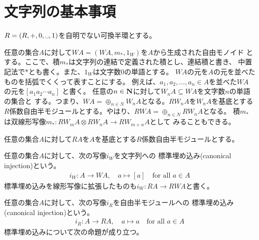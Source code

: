 \section{文字列の基本事項}\label{s1:文字列の基本事項} %
	$R=(R,+,0,\myspace,1)$を自明でない可換半環とする。

	任意の集合$A$に対して$WA=(WA,m_*,1_W)$を$A$から生成された自由モノイド
	とする。ここで、積$m_*$は文字列の連結で定義された積とし、連結積と書き、
	中置記法で$*$とも書く。また、$1_W$は文字数$0$の単語とする。
	$WA$の元を$A$の元を並べたものを括弧でくくって表すことにする。
	例えば、$a_1,a_2,\dots, a_n\in A$を並べた$WA$の元を$[a_1a_2\cdots a_n]$
	と書く。
	任意の$n\in{\mathbf{N}}$に対して$W_nA\subseteq WA$を文字数$n$の単語の集合と
	する。つまり、$WA=\oplus_{n\in N}W_nA$となる。$RW_nA$を$W_nA$を基底とする
	$R$係数自由半モジュールとする。やはり、$RWA=\oplus_{n\in N}RW_nA$となる。
	積$m_*$は双線形写像$m_*:RW_mA\otimes RW_nA\to RW_{m+n}A$として
	みることもできる。

	任意の集合$A$に対して$RA$を$A$を基底とする$R$係数自由半モジュールとする。

	任意の集合$A$に対して、次の写像$i_W$を文字列への
	標準埋め込み(canonical injection)という。
	\begin{equation*}\begin{split} %
		i_W: A\to WA,\quad a\mapsto [a] \quad\text{for all }a\in A
	\end{split}\end{equation*} %
	標準埋め込みを線形写像に拡張したものも$i_W:RA\to RWA$と書く。

	任意の集合$A$に対して、次の写像$i_R$を自由半モジュールへの
	標準埋め込み(canonical injection)という。
	\begin{equation*}\begin{split} %
		i_R: A\to RA,\quad a\mapsto a \quad\text{for all }a\in A
	\end{split}\end{equation*} %
	標準埋め込みについて次の命題が成り立つ。

